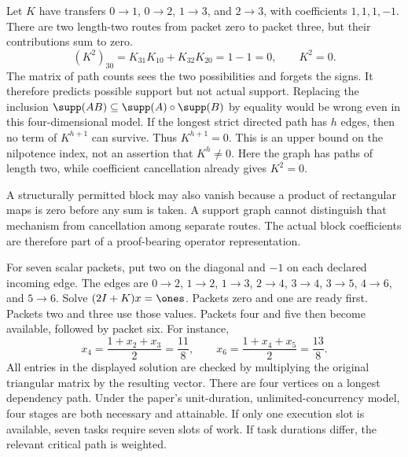 Let $K$ have transfers $0\to1$, $0\to2$, $1\to3$, and $2\to3$, with coefficients $1,1,1,-1$. There are two length-two routes from packet zero to packet three, but their contributions sum to zero.
\[
(K^2)_{30}=K_{31}K_{10}+K_{32}K_{20}=1-1=0,
\qquad K^2=0.
\]
The matrix of path counts sees the two possibilities and forgets the signs. It therefore predicts possible support but not actual support. Replacing the inclusion $\supp(AB)\subseteq\supp(A)\circ\supp(B)$ by equality would be wrong even in this four-dimensional model.
If the longest strict directed path has $h$ edges, then no term of $K^{h+1}$ can survive. Thus $K^{h+1}=0$. This is an upper bound on the nilpotence index, not an assertion that $K^h\ne0$. Here the graph has paths of length two, while coefficient cancellation already gives $K^2=0$.

A structurally permitted block may also vanish because a product of rectangular maps is zero before any sum is taken. A support graph cannot distinguish that mechanism from cancellation among separate routes. The actual block coefficients are therefore part of a proof-bearing operator representation.

For seven scalar packets, put two on the diagonal and $-1$ on each declared incoming edge. The edges are $0\to2$, $1\to2$, $1\to3$, $2\to4$, $3\to4$, $3\to5$, $4\to6$, and $5\to6$. Solve $(2I+K)x=\ones$.
Packets zero and one are ready first. Packets two and three use those values. Packets four and five then become available, followed by packet six. For instance,
\[
x_4=\frac{1+x_2+x_3}{2}=\frac{11}{8},\qquad
x_6=\frac{1+x_4+x_5}{2}=\frac{13}{8}.
\]
All entries in the displayed solution are checked by multiplying the original triangular matrix by the resulting vector.
There are four vertices on a longest dependency path. Under the paper's unit-duration, unlimited-concurrency model, four stages are both necessary and attainable. If only one execution slot is available, seven tasks require seven slots of work. If task durations differ, the relevant critical path is weighted.

